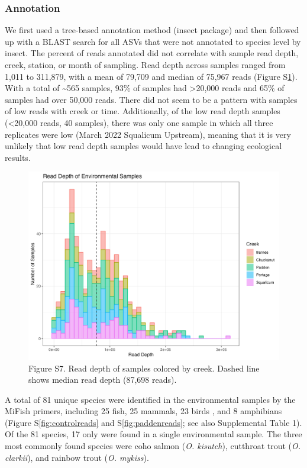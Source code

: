 \documentclass[
]{article}
\begin{document}
\hypertarget{annotation}{%
\subsubsection{Annotation}\label{annotation}}

We first used a tree-based annotation method (insect package) and then
followed up with a BLAST search for all ASVs that were not annotated to
species level by insect. The percent of reads annotated did not
correlate with sample read depth, creek, station, or month of sampling.
Read depth across samples ranged from 1,011 to 311,879, with a mean of
79,709 and median of 75,967 reads (Figure S\ref{fig:readdepth}). With a
total of \textasciitilde565 samples, 93\% of samples had
\textgreater20,000 reads and 65\% of samples had over 50,000 reads.
There did not seem to be a pattern with samples of low reads with creek
or time. Additionally, of the low read depth samples (\textless20,000
reads, 40 samples), there was only one sample in which all three
replicates were low (March 2022 Squalicum Upstream), meaning that it is
very unlikely that low read depth samples would have lead to changing
ecological results.

\begin{figure}
\centering
\includegraphics{../Output/SupplementalFigures/read_depths.png}
\caption{Figure S7. Read depth of samples colored by creek. Dashed line
shows median read depth (87,698 reads).\label{fig:readdepth}}
\end{figure}

A total of 81 unique species were identified in the environmental
samples by the MiFish primers, including 25 fish, 25 mammals, 23 birds ,
and 8 amphibians (Figure S\ref{fig:controlreads} and
S\ref{fig:paddenreads}; see also Supplemental Table 1). Of the 81
species, 17 only were found in a single environmental sample. The three
most commonly found species were coho salmon (\emph{O. kisutch}),
cutthroat trout (\emph{O. clarkii}), and rainbow trout (\emph{O.
mykiss}).
\end{document}
